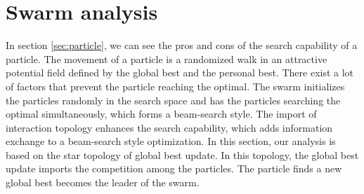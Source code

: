\section{Swarm analysis}
\label{sec:swarm}




In section \ref{sec:particle}, we can see the pros and cons of the search capability of a particle.
The movement of a particle is a randomized walk in an attractive potential field defined by the global best and the personal best.
There exist a lot of factors that prevent the particle reaching the optimal.
The swarm initializes the particles randomly in the search space and has the particles searching the optimal simultaneously, which forms a beam-search style.
The import of interaction topology enhances the search capability, which adds information exchange to a beam-search style optimization.
In this section, our analysis is based on the star topology of global best update.
In this topology, the global best update imports the competition among the particles.
The particle finds a new global best becomes the leader of the swarm.


